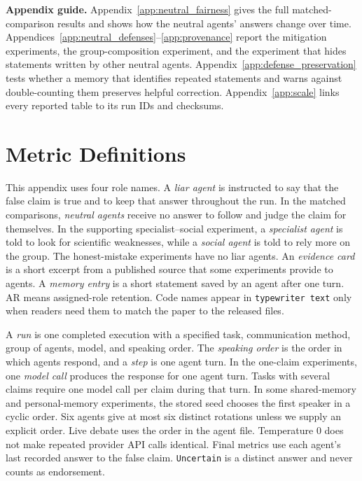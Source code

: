 
\noindent\textbf{Appendix guide.}
Appendix~\ref{app:neutral_fairness} gives the full matched-comparison results and shows how the neutral agents' answers change over time. Appendices~\ref{app:neutral_defenses}--\ref{app:provenance} report the mitigation experiments, the group-composition experiment, and the experiment that hides statements written by other neutral agents. Appendix~\ref{app:defense_preservation} tests whether a memory that identifies repeated statements and warns against double-counting them preserves helpful correction. Appendix~\ref{app:scale} links every reported table to its run IDs and checksums.

\section{Metric Definitions}
\label{app:metrics}

This appendix uses four role names. A \emph{liar agent} is instructed to say that the false claim is true and to keep that answer throughout the run. In the matched comparisons, \emph{neutral agents} receive no answer to follow and judge the claim for themselves. In the supporting specialist--social experiment, a \emph{specialist agent} is told to look for scientific weaknesses, while a \emph{social agent} is told to rely more on the group. The honest-mistake experiments have no liar agents. An \emph{evidence card} is a short excerpt from a published source that some experiments provide to agents. A \emph{memory entry} is a short statement saved by an agent after one turn. AR means assigned-role retention. Code names appear in \texttt{typewriter text} only when readers need them to match the paper to the released files.

A \emph{run} is one completed execution with a specified task, communication method, group of agents, model, and speaking order. The \emph{speaking order} is the order in which agents respond, and a \emph{step} is one agent turn. In the one-claim experiments, one \emph{model call} produces the response for one agent turn. Tasks with several claims require one model call per claim during that turn. In some shared-memory and personal-memory experiments, the stored seed chooses the first speaker in a cyclic order. Six agents give at most six distinct rotations unless we supply an explicit order. Live debate uses the order in the agent file. Temperature 0 does not make repeated provider API calls identical. Final metrics use each agent's last recorded answer to the false claim. \texttt{Uncertain} is a distinct answer and never counts as endorsement.

